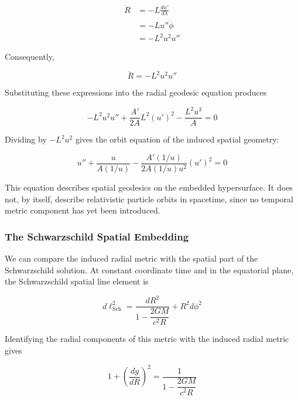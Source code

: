 \documentclass[pdflatex,sn-mathphys-num]{sn-jnl}%
\theoremstyle{thmstyleone}%
\theoremstyle{thmstyletwo}%
\theoremstyle{thmstylethree}%
\begin{document}
\begin{appendices}
\begin{equation}
    \begin{aligned}
        \ddot{R}
        &=
        -L\frac{du'}{d\lambda}\\
        &=
        -Lu''\dot{\phi}\\
        &=
        -L^2u^2u''
    \end{aligned}
\end{equation}

Consequently,

\begin{equation}
    \boxed{
        \ddot{R}=-L^2u^2u''
    }
\end{equation}

Substituting these expressions into the radial geodesic equation produces

\begin{equation}
    -L^2u^2u''
    +
    \frac{A'}{2A}L^2(u')^2
    -
    \frac{L^2u^3}{A}
    =0
\end{equation}

Dividing by $-L^2u^2$ gives the orbit equation of the induced spatial geometry:

\begin{equation}
    \boxed{
    u''
    +
    \frac{u}{A(1/u)}
    -
    \frac{A'(1/u)}
    {2A(1/u)u^2}
    (u')^2
    =0
    }
\end{equation}

This equation describes spatial geodesics on the embedded hypersurface. It does not, by itself, describe relativistic particle orbits in spacetime, since no temporal metric component has yet been introduced.

\subsubsection{The Schwarzschild Spatial Embedding}

We can compare the induced radial metric with the spatial part of the Schwarzschild solution. At constant coordinate time and in the equatorial plane, the Schwarzschild spatial line element is

\begin{equation}
    d\ell_{\mathrm{Sch}}^2
    =
    \frac{dR^2}
    {1-\dfrac{2GM}{c^2R}}
    +
    R^2d\phi^2
\end{equation}

Identifying the radial components of this metric with the induced radial metric gives

\begin{equation}
    1+\left(\frac{dy}{dR}\right)^2
    =
    \frac{1}{1-\dfrac{2GM}{c^2R}}
\end{equation}


\end{appendices}
\end{document}
